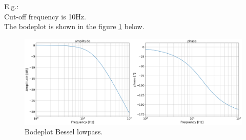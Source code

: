 E.g.: \\
Cut-off frequency is 10Hz.\\
The bodeplot is shown in the figure \ref{fig:lp_bessel} below.
\begin{figure}[h!]
  \includegraphics[width=.75\linewidth]{lp_bessel.png}
  \caption{Bodeplot Bessel lowpass.}
  \label{fig:lp_bessel}
\end{figure}